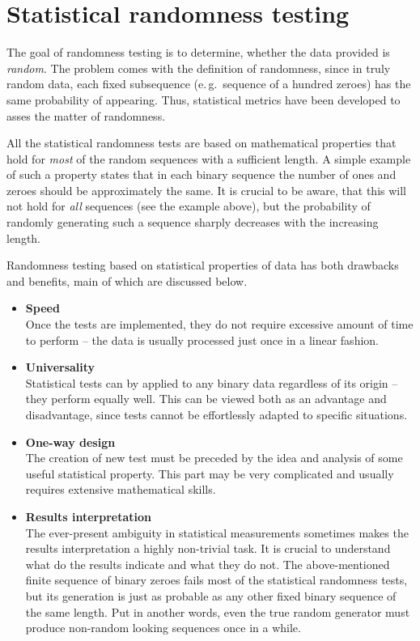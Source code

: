 \documentclass[12pt,oneside]{fithesis2}
\newcommand{\squarebullet}{\textcolor{black}{\raisebox{0.15em}{\rule{4pt}{4pt}}}}
\newenvironment{myItemize}{
  \begin{itemize}[leftmargin=2em,rightmargin=1em,itemsep=\parskip ,parsep=0em,topsep=0em,partopsep=0em]
  \renewcommand{\labelitemi}{\squarebullet}
  \renewcommand{\labelitemii}{$\diamond$}
}{
  \end{itemize}
}
\begin{document}
\chapter{Statistical randomness testing}
\label{chap:stat-rand-testing}

The goal of randomness testing is to determine, whether the data provided is \textit{random}. 
The problem comes with the definition of randomness, since in truly random data, 
each fixed subsequence (e.\,g.\ sequence of a hundred zeroes) has the same probability of appearing.
Thus, statistical metrics have been developed to asses the matter of randomness.

All the statistical randomness tests are based on mathematical properties that hold for
\textit{most} of the random sequences with a sufficient length.
A simple example of such a property states that in each binary sequence the number of ones and zeroes should be 
approximately the same. It is crucial to be aware, that this will not hold for \textit{all} sequences (see the example above),
but the probability of randomly generating such a sequence sharply decreases with the increasing length.

Randomness testing based on statistical properties of data has both drawbacks and benefits, main of which are discussed below.
\begin{myItemize}
\item \textbf{Speed}\\
Once the tests are implemented, they do not require excessive amount of time to perform -- 
the data is usually processed just once in a linear fashion.
\item \textbf{Universality}\\
Statistical tests can by applied to any binary data regardless of its origin -- they perform equally well. 
This can be viewed both as an advantage and disadvantage, since tests cannot be effortlessly adapted to specific situations.
\item \textbf{One-way design}\\
The creation of new test must be preceded by the idea and analysis of some useful statistical property. This part may be 
very complicated and usually requires extensive mathematical skills.
\item \textbf{Results interpretation}\\
The ever-present ambiguity in statistical measurements sometimes makes the results interpretation a highly non-trivial task.
It is crucial to understand what do the results indicate and what they do not. The above-mentioned finite sequence of binary zeroes
fails most of the statistical randomness tests, but its generation is just as probable 
as any other fixed binary sequence of the same length.
Put in another words, even the true random generator must produce non-random looking sequences once in a while.
\end{myItemize}
\end{document}
